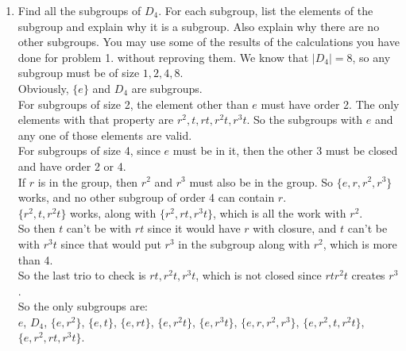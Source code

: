 \documentclass[12pt]{article}
\begin{document}
\begin{enumerate}
		\item Find all the subgroups of $D_4$. For each subgroup, list the elements of the subgroup and explain why it is a subgroup. Also explain why there are no other subgroups. You may use some of the results of the calculations you have done for problem 1. without reproving them.\m
		We know that $|D_4| = 8$, so any subgroup must be of size $1,2,4,8$.\\
		Obviously, $\{e\}$ and $D_4$ are subgroups.\\
		For subgroups of size 2, the element other than $e$ must have order 2. The only elements with that property are $r^2,t,rt,r^2t,r^3t$. So the subgroups with $e$ and any one of those elements are valid.\\
		For subgroups of size 4, since $e$ must be in it, then the other 3 must be closed and have order 2 or 4.\\
		If $r$ is in the group, then $r^2$ and $r^3$ must also be in the group. So $\{e,r,r^2,r^3\}$ works, and no other subgroup of order 4 can contain $r$.\\
		$\{r^2,t,r^2t\}$ works, along with $\{r^2,rt,r^3t\}$, which is all the work with $r^2$.\\
		So then $t$ can't be with $rt$ since it would have $r$ with closure, and $t$ can't be with $r^3t$ since that would put $r^3$ in the subgroup along with $r^2$, which is more than 4.\\
		So the last trio to check is $rt,r^2t,r^3t$, which is not closed since $rtr^2t$ creates $r^3$.\\
		So the only subgroups are:\\
		$e$, $D_4$, $\{e,r^2\}$, $\{e,t\}$, $\{e,rt\}$, $\{e,r^2t\}$, $\{e,r^3t\}$, 
		$\{e,r,r^2,r^3\}$, $\{e,r^2,t,r^2t\}$, $\{e,r^2,rt,r^3t\}$.
		

\end{enumerate}
\end{document}
